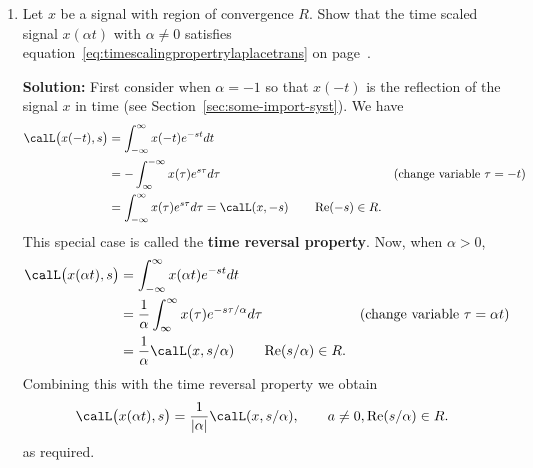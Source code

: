 \documentclass[11pt,a4paper]{book}
\theoremstyle{plain}
\numberwithin{equation}{section}
\renewcommand{\Re}{\operatorname{Re}}
\newcommand{\term}{\textbf}
\newcommand{\abs}[1]{\left\vert #1 \right\vert}
\newenvironment{solution}{\begin{footnotesize}\textbf{Solution:}}{\end{footnotesize}}
\newenvironment{excersizelist}{%
  \renewcommand*{\theenumi}{\thechapter.\arabic{enumi}}%
  \newcommand\itemadvanced{\stepcounter{enumi}\item[$\ast$\, \theenumi.]}
  \begin{enumerate}
}{%
  \end{enumerate}
}
\begin{document}
\begin{excersizelist}
\item \label{excer:timescalelaplace} Let $x$ be a signal with region of convergence $R$.  Show that the time scaled signal $x(\alpha t)$ with $\alpha \neq 0$ satisfies equation~\eqref{eq:timescalingpropertrylaplacetrans} on page~\pageref{eq:timescalingpropertrylaplacetrans}.
\begin{solution}
First consider when $\alpha = -1$ so that $x(-t)$ is the reflection of the signal $x$ in time (see Section~\ref{sec:some-import-syst}).  We have 
\begin{align*}
 \calL\big( x(-t), s \big) &=  \int_{-\infty}^{\infty} x(-t)  e^{-s t} dt \\
 &=  -\int_{\infty}^{-\infty} x(\tau)  e^{s\tau} d\tau & \text{(change variable $\tau = -t$)}\\
 &=  \int_{-\infty}^{\infty} x(\tau)  e^{ s \tau} d\tau = \calL(x, -s) \qquad \Re(-s) \in R.
 \end{align*}
 This special case is called the \term{time reversal property}.  Now, when $\alpha > 0$,
 \begin{align*}
 \calL\big( x(\alpha t), s \big) &=  \int_{-\infty}^{\infty} x(\alpha t)  e^{-s t} dt \\
 &=  \frac{1}{\alpha} \int_{\infty}^{\infty} x(\tau)  e^{-s \tau / \alpha}  d\tau & \text{(change variable $\tau = \alpha t$)}\\
 &= \frac{1}{\alpha} \calL(x, s / \alpha) \qquad \Re(s/\alpha) \in R.
 \end{align*}
Combining this with the time reversal property we obtain
 \[
 \calL\big(x(\alpha t),s\big) = \frac{1}{\abs{\alpha}} \calL(x, s/\alpha), \qquad a \neq 0, \Re(s/\alpha) \in R.
 \]
as required.
\end{solution}




\end{excersizelist}
\end{document}
